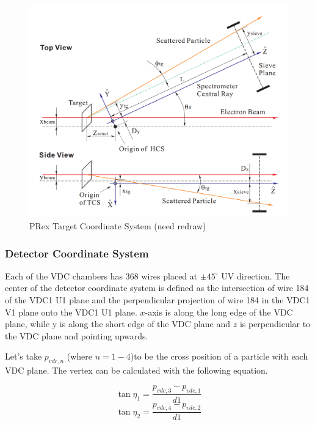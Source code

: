 \begin{figure}[!h]
    \centering
    \includegraphics[width=\textwidth]{images/chap4/target_coordinate_system.png}
    \caption{PRex Target Coordinate System  (need redraw)}
    \label{fig:target_coordinate_system}
\end{figure}


\subsubsection{Detector Coordinate System}

Each of the VDC chambers has 368 wires placed at $\pm 45 ^{\circ}$ UV direction. The center of the detector coordinate system is defined as the intersection of wire 184 of the VDC1 U1 plane and the perpendicular projection of wire 184 in the VDC1 V1 plane onto the VDC1 U1 plane. $x$-axis is along the long edge of the VDC plane, while y is along the short edge of the VDC plane and $z$ is perpendicular to the VDC plane and pointing upwards. 

Let's take $p_{vdc,n}$ (where ${n=1-4}$)to be the cross position of a particle with each VDC plane. The vertex can be calculated with the following equation. 

\begin{equation}
    \tan \eta_{1} = \frac{p_{vdc,3} - p_{vdc, 1}}{d1}    
\end{equation}
\begin{equation}
    \tan \eta_{2} = \frac{p_{vdc,4} - p_{vdc, 2}}{d1}    
\end{equation}

